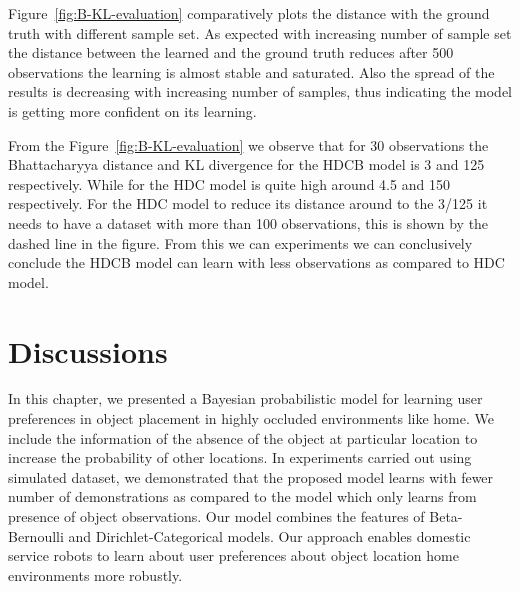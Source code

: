 Figure~\ref{fig:B-KL-evaluation} comparatively plots the distance with the ground truth with different sample set. As expected with increasing number of sample set the distance between the learned and the ground truth reduces after 500 observations the learning is almost stable and saturated. Also the spread of the results is decreasing with increasing number of samples, thus indicating the model is getting more confident on its learning. 

From the Figure~\ref{fig:B-KL-evaluation} we observe that for 30 observations the Bhattacharyya distance  and KL divergence for the HDCB model is 3 and 125 respectively. While for the HDC model is quite high around 4.5 and 150 respectively. For the HDC model to reduce its distance around to the 3/125 it needs to have a dataset with more than 100 observations, this is shown by the dashed line in the figure. From this we can experiments we can conclusively conclude the HDCB model can learn with less observations as compared to HDC model.
 

\section{Discussions}

In this chapter, we presented a Bayesian probabilistic model for learning user preferences in object placement in highly occluded environments like home. We include the information of the absence of the object at particular location to increase the probability of other locations. In experiments carried out using simulated dataset, we demonstrated that the proposed model learns with fewer number of demonstrations as compared to the model which only learns from presence of object observations. Our model combines the features of Beta-Bernoulli and Dirichlet-Categorical models. Our approach enables domestic service robots to learn about user preferences about object location home environments more robustly.